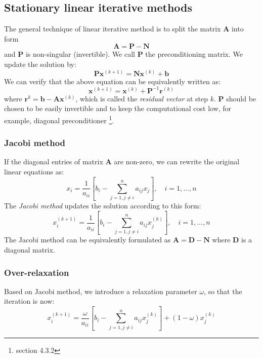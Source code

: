 \documentclass{article}
\begin{document}
\subsection{Stationary linear iterative methods}
The general technique of linear iterative method is to split the matrix $\mathbf{A}$
into form 
\[\mathbf{A} = \mathbf{P} - \mathbf{N}\]
and $\mathbf{P}$ is non-singular (invertible). We call $\mathbf{P}$ the 
preconditioning matrix. We update the solution by:
\[\mathbf{P}\mathbf{x}^{(k+1)} = \mathbf{N}\mathbf{x}^{(k)} + \mathbf{b}\]
We can verify that the above equation can be equivalently written as:
\[\mathbf{x}^{(k+1)} = \mathbf{x}^{(k)} + \mathbf{P}^{-1}\mathbf{r}^{(k)}\]
where $\mathbf{r}^{k} = \mathbf{b} - \mathbf{A}\mathbf{x}^{(k)}$, which is called 
the \emph{residual vector} at step $k$. $\mathbf{P}$ should be chosen to be easily invertible
and to keep the computational cost low, for example, diagonal preconditioner
\footnote{section 4.3.2}. 

\subsubsection{Jacobi method}
If the diagonal entries of matrix $\mathbf{A}$ are non-zero, we can rewrite the 
original linear equations as:
\begin{equation}
    x_i = \frac{1}{a_{ii}}\left[
        b_i - \sum_{j=1, j\neq i}^n a_{ij}x_j
    \right], \quad i = 1, \dots, n
\end{equation}
The \emph{Jacobi method} updates the solution according to this form:
\begin{equation}
    x_i^{(k+1)} = \frac{1}{a_{ii}}\left[
        b_i - \sum_{j=1, j\neq i}^n a_{ij}x_j^{(k)}
    \right], \quad i = 1, \dots, n
\end{equation}
The Jacobi method can be equivalently formulated as 
$\mathbf{A} = \mathbf{D} - \mathbf{N}$ where $\mathbf{D}$ is a diagonal matrix.

\subsubsection{Over-relaxation}
Based on Jacobi method, we introduce a relaxation parameter $\omega$, so that 
the iteration is now:
\begin{equation}
    x_i^{(k+1)} = \frac{\omega}{a_{ii}}\left[
        b_i - \sum_{j=1, j\neq i}^n a_{ij}x_j^{(k)}
    \right] + (1-\omega)x_j^{(k)}
\end{equation}
\end{document}
